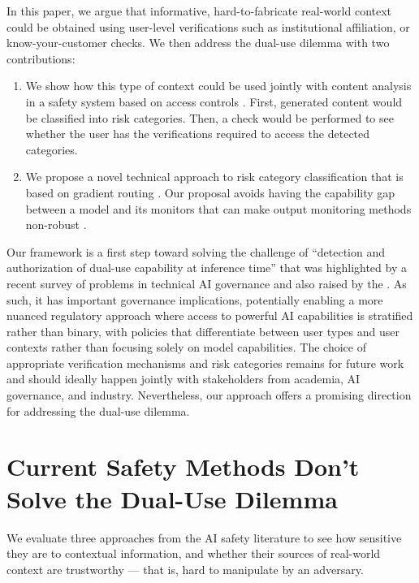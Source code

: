 \documentclass{article}
\theoremstyle{plain}
\theoremstyle{definition}
\theoremstyle{remark}
\begin{document}
In this paper, we argue that informative, hard-to-fabricate
real-world context could be obtained using user-level verifications
such as institutional affiliation, or know-your-customer checks. We
then address the dual-use dilemma with two contributions:
\begin{enumerate}
  \item We show how this type of context could be used jointly with content analysis in a safety system based on access controls \cite{butler1974}. First, generated content would be classified into risk categories. Then, a check would be performed to see whether the user has the verifications required to access the detected categories.
  \item We propose a novel technical approach to risk
    category classification that is based on gradient routing \cite{cloud2024gradientroutingmaskinggradients}. Our proposal avoids having the capability gap between a model and its monitors that can make output monitoring methods non-robust \cite{jin2024jailbreakinglargelanguagemodels}.
\end{enumerate}

Our framework is a first step toward solving the challenge of ``detection and authorization of dual-use capability at inference time'' that was highlighted by a recent survey of problems in technical AI governance \cite{reuel2025openproblemstechnicalai} and also raised by the \citet{NIST_AI_800_1_ipd_2024}.
As such, it has important governance implications, potentially enabling a more nuanced regulatory approach where access to powerful AI capabilities is stratified rather than binary, with policies that differentiate between user types and user contexts rather than focusing solely on model capabilities.
The choice of appropriate verification mechanisms and risk categories remains for future work and should ideally happen jointly with stakeholders from academia, AI governance, and industry.
Nevertheless, our approach offers a promising direction for addressing the dual-use dilemma.

\section{Current Safety Methods Don't Solve the Dual-Use Dilemma}
\label{section:current-methods}

We evaluate three approaches from the AI safety literature to see how sensitive they are to contextual information, and whether their sources of real-world context are trustworthy --- that is, hard to manipulate by an adversary.
\end{document}
